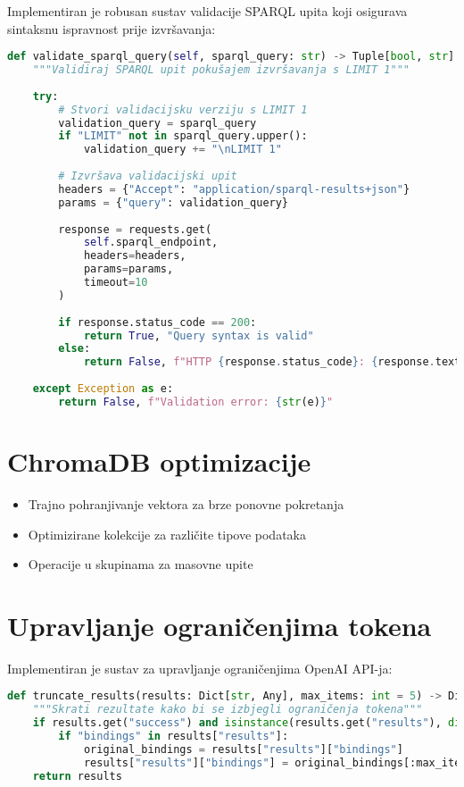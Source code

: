 Implementiran je robusan sustav validacije SPARQL upita koji osigurava sintaksnu ispravnost prije izvršavanja:

\begin{lstlisting}[language=Python, caption=SPARQL validacija]
def validate_sparql_query(self, sparql_query: str) -> Tuple[bool, str]:
    """Validiraj SPARQL upit pokušajem izvršavanja s LIMIT 1"""
    
    try:
        # Stvori validacijsku verziju s LIMIT 1
        validation_query = sparql_query
        if "LIMIT" not in sparql_query.upper():
            validation_query += "\nLIMIT 1"
        
        # Izvršava validacijski upit
        headers = {"Accept": "application/sparql-results+json"}
        params = {"query": validation_query}
        
        response = requests.get(
            self.sparql_endpoint, 
            headers=headers, 
            params=params, 
            timeout=10
        )
        
        if response.status_code == 200:
            return True, "Query syntax is valid"
        else:
            return False, f"HTTP {response.status_code}: {response.text[:200]}"
            
    except Exception as e:
        return False, f"Validation error: {str(e)}"
\end{lstlisting}

\section{ChromaDB optimizacije}
\label{sec:chromadb_optimizations}

\begin{itemize}
    \item Trajno pohranjivanje vektora za brze ponovne pokretanja
    \item Optimizirane kolekcije za različite tipove podataka
    \item Operacije u skupinama za masovne upite
\end{itemize}

\section{Upravljanje ograničenjima tokena}
\label{sec:token_management}

Implementiran je sustav za upravljanje ograničenjima OpenAI API-ja:

\begin{lstlisting}[language=Python, caption=Upravljanje ograničenjima tokena]
def truncate_results(results: Dict[str, Any], max_items: int = 5) -> Dict[str, Any]:
    """Skrati rezultate kako bi se izbjegli ograničenja tokena"""
    if results.get("success") and isinstance(results.get("results"), dict):
        if "bindings" in results["results"]:
            original_bindings = results["results"]["bindings"]
            results["results"]["bindings"] = original_bindings[:max_items]
    return results
\end{lstlisting}


